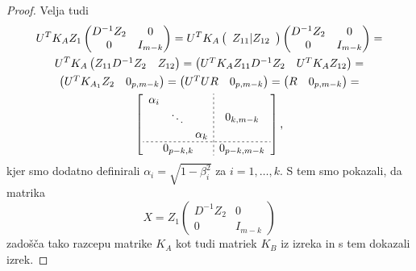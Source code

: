 \documentclass[mat1]{article}
\begin{document}
\begin{proof}
Velja tudi
\begin{gather*}
U^T K_A Z_1
\begin{pmatrix}
D^{-1} Z_2 & 0\\ 
0 & I_{m-k}
\end{pmatrix} = 
U^T K_A \left(\begin{array}{c} Z_{11} | Z_{12} \end{array}\right)
\begin{pmatrix}
D^{-1} Z_2 & 0\\ 
0 & I_{m-k}
\end{pmatrix} = \\
U^T K_A
\begin{pmatrix}
 Z_{11} D^{-1} Z_2 & Z_{12} 
\end{pmatrix} =
\begin{pmatrix}
U^T K_A Z_{11} D^{-1} Z_2 & U^T K_A Z_{12} 
\end{pmatrix} = \\
\begin{pmatrix}
U^T K_{A_1} Z_2 & 0_{p, m-k} 
\end{pmatrix} =
\begin{pmatrix}
U^T U R & 0_{p, m-k}
\end{pmatrix} =
\begin{pmatrix}
R & 0_{p, m-k} 
\end{pmatrix} = \\
\left[
\begin{array}{c;{2pt/2pt}c}
\begin{matrix}
\alpha_i & & \\
 & \ddots & \\
 & & \alpha_k
\end{matrix} & 0_{k, m-k}
 \\ \hdashline[2pt/2pt]
0_{p-k, k} & 0_{p-k, m-k}
\end{array} \right] \text{,}
\end{gather*}
kjer smo dodatno definirali $\alpha_i = \sqrt{1-\beta_i^2}$ za $i = 1, \ldots, k$.
S tem smo pokazali, da matrika $$ X = Z_1 
\begin{pmatrix}
D^{-1} Z_2 & 0\\ 
0 & I_{m-k}
\end{pmatrix}
$$
zadošča tako razcepu matrike $K_A$ kot tudi matriek $K_B$ iz izreka in s tem dokazali izrek.
\end{proof}
\end{document}
